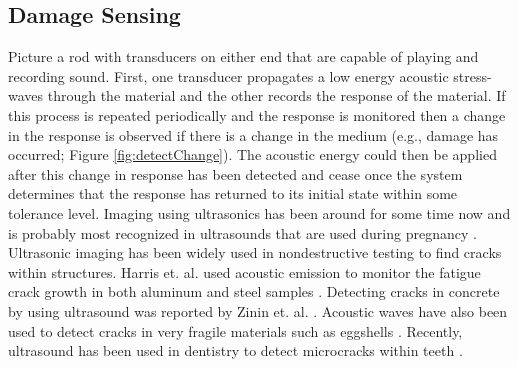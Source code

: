 \subsection{Damage Sensing}

Picture a rod with transducers on either end that are capable of playing and recording sound. First, one transducer propagates a low energy acoustic stress-waves through the material and the other records the response of the material. If this process is repeated periodically and the response is monitored then a change in the response is observed if there is a change in the medium (e.g., damage has occurred; Figure \ref{fig:detectChange}). The acoustic energy could then be applied after this change in response has been detected and cease once the system determines that the response has returned to its initial state within some tolerance level. Imaging using ultrasonics has been around for some time now and is probably most recognized in ultrasounds that are used during pregnancy \cite{Ultrasound2006}. Ultrasonic imaging has been widely used in nondestructive testing to find cracks within structures. Harris et. al. used acoustic emission to monitor the fatigue crack growth in both aluminum and steel samples \cite{Harris1974}. Detecting cracks in concrete by using ultrasound was reported by Zinin et. al. \cite{Zinin2000}. Acoustic waves have also been used to detect cracks in very fragile materials such as eggshells \cite{DeKetelaere2000}. Recently, ultrasound has been used in dentistry to detect microcracks within teeth \cite{Matsushita2012}.

